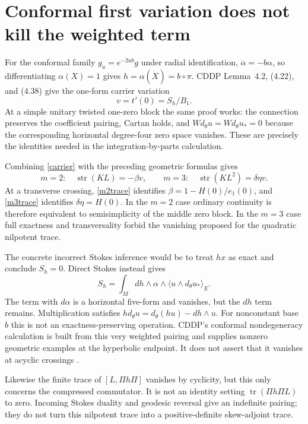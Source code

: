 \documentclass[11pt]{article}
\newcommand{\tr}{\operatorname{tr}}
\newcommand{\str}{\operatorname{str}}
\begin{document}
\section{Conformal first variation does not kill the weighted term}
For the conformal family $g_u=e^{-2u b}g$ under radial identification,
$\dot\alpha=-b\alpha$, so differentiating $\alpha(X)=1$ gives
$h=\alpha(\dot X)=b\circ\pi$. CDDP Lemma~4.2, (4.22), and (4.38)
give the one-form carrier variation
\begin{equation}\label{carrier}
                 v=t'(0)=S_h/B_1.
\end{equation}
At a simple unitary twisted one-zero block the same proof works:
the connection preserves the coefficient pairing, Cartan holds, and
$W d_\theta u=W d_\theta u_*=0$ because the corresponding horizontal
degree-four zero space vanishes. These are precisely the identities
needed in the integration-by-parts calculation.

Combining \eqref{carrier} with the preceding geometric formulas gives
\[
 m=2:\quad \str(KL)=-\beta v,
 \qquad
 m=3:\quad \str(KL^2)=\delta\eta v.
\]
At a transverse crossing, \eqref{m2trace} identifies
$\beta=1-H(0)/e_1(0)$, and \eqref{m3trace} identifies
$\delta\eta=H(0)$. In the $m=2$ case ordinary continuity is therefore
equivalent to semisimplicity of the middle zero block. In the $m=3$
case full exactness and transversality forbid the vanishing proposed
for the quadratic nilpotent trace.

The concrete incorrect Stokes inference would be to treat $h x$ as
exact and conclude $S_h=0$. Direct Stokes instead gives
\begin{equation}\label{weightedstokes}
 S_h=\int_M dh\wedge\alpha\wedge
                     \langle u\wedge d_\theta u_*\rangle_E.
\end{equation}
The term with $d\alpha$ is a horizontal five-form and vanishes, but
the $dh$ term remains. Multiplication satisfies
$h d_\theta u=d_\theta(hu)-dh\wedge u$.
For nonconstant base $b$ this is not an exactness-preserving operation.
CDDP's conformal nondegeneracy calculation is built from this very
weighted pairing and supplies nonzero geometric examples at the
hyperbolic endpoint. It does not assert that it vanishes at acyclic
crossings \cite{CDDP}.

Likewise the finite trace of $[L,\Pi h\Pi]$ vanishes by cyclicity,
but this only concerns the compressed commutator. It is not an
identity setting $\tr(\Pi h\Pi L)$ to zero. Incoming Stokes duality
and geodesic reversal give an indefinite pairing; they do not turn
this nilpotent trace into a positive-definite skew-adjoint trace.
\end{document}
